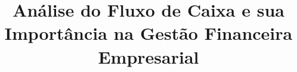 \documentclass[Portugues]{tese-IFCH}
\begin{document}

\title{\Large \textnormal{\textbf{Análise do Fluxo de Caixa e sua Importância na Gestão Financeira Empresarial}}}



\titulo{\textnormal{\textbf{}}}

\orientador{}

 
\qualificacaoDoutorado %






\paginasiniciais

%

%






\end{document}
